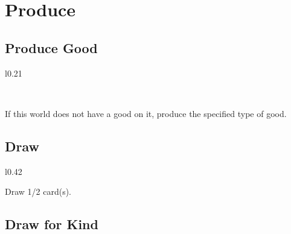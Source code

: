 \documentclass[letterpaper,landscape,twocolumn,8pt]{extarticle}
\begin{document}
\section{Produce}%

\begin{minipage}[t]{0.31\columnwidth}
\setlength{\intextsep}{0pt}%

\subsection*{Produce Good}

\begin{wrapfigure}{l}{0.21\columnwidth}

\\


\end{wrapfigure}

If this world does not have a good on it, produce the specified type of good.

\subsection*{Draw}

\begin{wrapfigure}{l}{0.42\columnwidth}


\end{wrapfigure}

\RaggedRight{}Draw 1/2 card(s).\justifying{}

\hfill{}
\subsection*{Draw for Kind}


\end{minipage}
\end{document}
